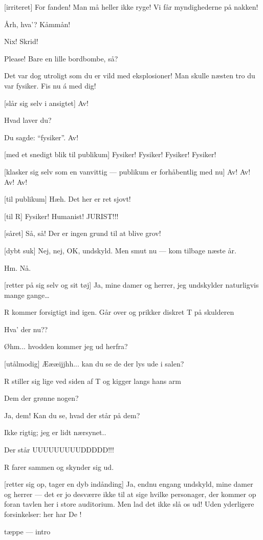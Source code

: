 \documentclass{article}
\begin{document}
\begin{sketch}
[irriteret] For fanden! Man må heller ikke ryge! Vi får myndighederne på nakken!

 Årh, hva'? Kåmmån!

 Nix! Skrid!

 Please! Bare en lille bordbombe, så? 

 Det var dog utroligt som du er vild med eksplosioner! Man skulle næsten tro du var fysiker. Fis nu \'a med dig!

[slår sig selv i ansigtet] Av!

 Hvad laver du?

 Du sagde: ``fysiker''.  Av!

[med et snedigt blik til publikum] Fysiker! Fysiker! Fysiker! Fysiker!

[klasker sig selv som en vanvittig --- publikum er forhåbentlig med nu] Av! Av! Av! Av!

[til publikum] Hæh. Det her er ret sjovt!

[til R] Fysiker! Humanist! JURIST!!!

[såret] Så, så! Der er ingen grund til at blive grov!

[dybt suk] Nej, nej, OK, undskyld. Men smut nu --- kom tilbage næste år.

 Hm. Nå. 

[retter på sig selv og sit tøj] Ja, mine damer og herrer, jeg
undskylder naturligvis mange gange\ldots{} 

\scene R kommer forsigtigt ind igen. Går over og prikker diskret T på skulderen

 Hva' der nu??

 Øhm... hvodden kommer jeg ud herfra?

[utålmodig] Æææijjhh... kan du se de der lys ude i salen?

\scene R stiller sig lige ved siden af T og kigger langs hans arm

 Dem der grønne nogen?

 Ja, dem!  Kan du se, hvad der står på dem?

 Ikke rigtig; jeg er lidt nærsynet..

 Der står  UUUUUUUUUDDDDD!!!

\scene R farer sammen og skynder sig ud.

[retter sig op, tager en dyb indånding] Ja, endnu engang undskyld, mine
damer og herrer --- det er jo desværre ikke til at sige hvilke personager, der
kommer op foran tavlen her i store auditorium. Men lad det ikke slå os ud! Uden
yderligere forsinkelser: her har De !

\scene tæppe --- intro

\end{sketch}
\end{document}
